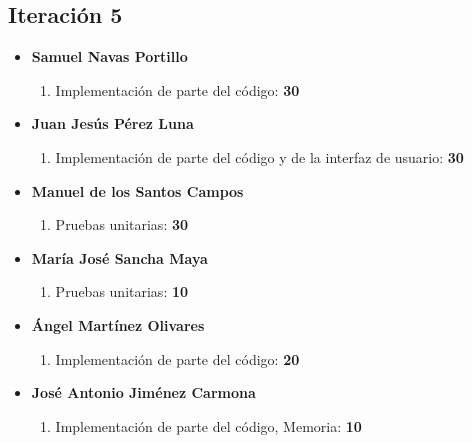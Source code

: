 \documentclass[11 pt]{book}
\begin{document}
		\subsection*{Iteración 5}
		    \begin{itemize}
			    \item \textbf {Samuel Navas Portillo}
				    \begin{enumerate}
					    \item Implementación de parte del código: \textbf{30}
				    \end{enumerate}
			    \item \textbf {Juan Jesús Pérez Luna}
				    \begin{enumerate}
					    \item Implementación de parte del código y de la interfaz de usuario: \textbf{30}
				    \end{enumerate}
			    \item \textbf {Manuel de los Santos Campos}
				    \begin{enumerate}
					    \item Pruebas unitarias: \textbf{30}
				    \end{enumerate}
			    \item \textbf {María José Sancha Maya}
				    \begin{enumerate}
					    \item Pruebas unitarias: \textbf{10}
				    \end{enumerate}
			    \item \textbf {Ángel Martínez Olivares}
				    \begin{enumerate}
					    \item Implementación de parte del código: \textbf{20}
				    \end{enumerate}
			    \item \textbf {José Antonio Jiménez Carmona}
				    \begin{enumerate}
					    \item Implementación de parte del código, Memoria: \textbf{10}
				    \end{enumerate}
		    \end{itemize}
		    
\end{document}
